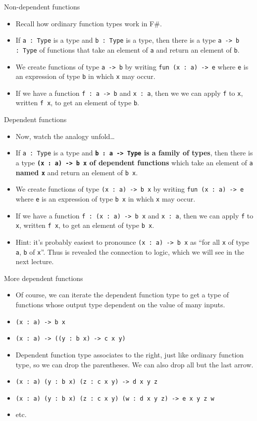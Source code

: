 \documentclass{beamer}
\newcommand{\m}[1]{\texttt{#1}}
\begin{document}
\begin{frame}{Non-dependent functions}
\begin{itemize}
	\item Recall how ordinary function types work in F\#.
	\item If \m{a :\ Type} is a type and \m{b :\ Type} is a type, then there is a type \m{a -> b :\ Type} of functions that take an element of \m{a} and return an element of \m{b}.
	\item We create functions of type \m{a -> b} by writing \m{fun (x :\ a) -> e} where \m{e} is an expression of type \m{b} in which \m{x} may occur.
	\item If we have a function \m{f :\ a -> b} and \m{x :\ a}, then we we can apply \m{f} to \m{x}, written \m{f x}, to get an element of type \m{b}.
\end{itemize}
\end{frame}

\begin{frame}{Dependent functions}
\begin{itemize}
	\item Now, watch the analogy unfold\dots
	\item If \m{a :\ Type} is a type and \textbf{\m{b :\ a -> Type} is a family of types}, then there is a type \textbf{\m{(x :\ a) -> b x} of dependent functions} which take an element of \m{a} \textbf{named \m{x}} and return an element of \m{b x}.
	\item We create functions of type \m{(x :\ a) -> b x} by writing \m{fun (x :\ a) -> e} where \m{e} is an expression of type \m{b x} in which \m{x} may occur.
	\item If we have a function \m{f :\ (x :\ a) -> b x} and \m{x :\ a}, then we can apply \m{f} to \m{x}, written \m{f x}, to get an element of type \m{b x}.
	\item Hint: it's probably easiest to pronounce \m{(x :\ a) -> b x} as ``for all \m{x} of type \m{a}, \m{b} of \m{x}''. Thus is revealed the connection to logic, which we will see in the next lecture.
\end{itemize}
\end{frame}

\begin{frame}{More dependent functions}
\begin{itemize}
	\item Of course, we can iterate the dependent function type to get a type of functions whose output type dependent on the value of many inputs.
	\item \m{(x :\ a) -> b x}
	\item \m{(x :\ a) -> ((y :\ b x) -> c x y)}
	\item Dependent function type associates to the right, just like ordinary function type, so we can drop the parentheses. We can also drop all but the last arrow.
	\item \m{(x :\ a) (y :\ b x) (z :\ c x y) -> d x y z}
	\item \m{(x :\ a) (y :\ b x) (z :\ c x y) (w : d x y z) -> e x y z w}
	\item etc.
\end{itemize}
\end{frame}
\end{document}
